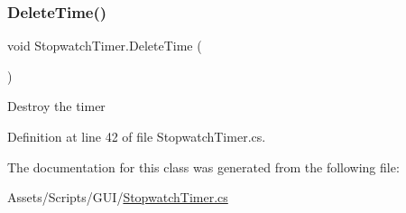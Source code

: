 \subsubsection{\texorpdfstring{Delete\+Time()}{DeleteTime()}}
{\footnotesize\ttfamily void Stopwatch\+Timer.\+Delete\+Time (\begin{DoxyParamCaption}{ }\end{DoxyParamCaption})}



Destroy the timer 



Definition at line 42 of file Stopwatch\+Timer.\+cs.



The documentation for this class was generated from the following file\+:\begin{DoxyCompactItemize}
\item 
Assets/\+Scripts/\+G\+U\+I/\mbox{\hyperlink{_stopwatch_timer_8cs}{Stopwatch\+Timer.\+cs}}\end{DoxyCompactItemize}
